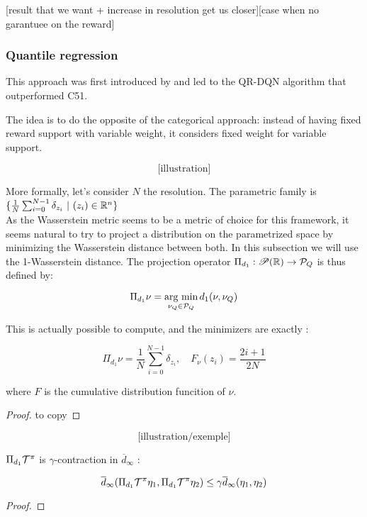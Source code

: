[result that we want + increase in resolution get us closer][case when no garantuee on the reward]

\subsubsection*{Quantile regression}

This approach was first introduced by \cite[Dabney et al.]{dabney_distributional_2017} and led to the \textsc{QR-DQN} algorithm that outperformed C51.

The idea is to do the opposite of the categorical approach: instead of having fixed reward support with variable weight, it considers fixed weight for variable support.

\[ \text{[illustration]} \]

More formally, let’s consider $N$ the resolution. The parametric family is $\{ \frac{1}{N} \sum_{i = 0}^{N-1} \delta_{z_i} \ | \ (z_i)\in \mathbb{R}^n \}$\\

As the Wasserstein metric seems to be a metric of choice for this framework, it seems natural to try to project a distribution on the parametrized space by minimizing the Wasserstein distance between both.
In this subsection we will use the 1-Wasserstein distance. The projection operator $\Pi_{d_1} : \mathscr{P}(\mathbb{R}) \rightarrow \mathcal{P}_Q$ is thus defined by:

\begin{equation}
    \Pi_{d_1}\nu = \operatorname*{\mbox{arg min}}_{\nu_Q \in \mathcal{P}_Q} d_1(\nu, \nu_Q)
\end{equation}

This is actually possible to compute, and the minimizers are exactly :

\[ \Pi_{d_1}\nu = \frac{1}{N} \sum_{i = 0}^{N-1} \delta_{z_i}, \quad F_\nu(z_i) = \frac{2i + 1}{2N} \]

where $F$ is the cumulative distribution funcition of $\nu$.
\begin{proof}
    to copy
\end{proof}

\[\text{[illustration/exemple]}\]

\begin{proposition}
    $\Pi_{d_1}\mathcal{T}^\pi$ is $\gamma$-contraction in $\overline{d}_\infty$ :

    \[ \overline{d}_\infty(\Pi_{d_1}\mathcal{T}^\pi\eta_1 , \Pi_{d_1}\mathcal{T}^\pi\eta_2) \leq \gamma \overline{d}_\infty(\eta_1, \eta_2)\]
\end{proposition}
\begin{proof}
    
\end{proof}

